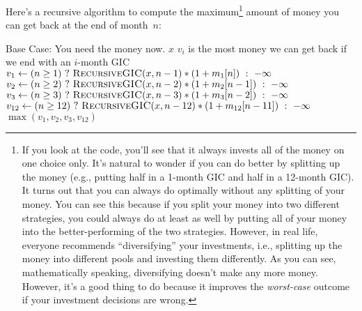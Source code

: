\documentclass[11pt]{article}
\begin{document}
Here's a recursive algorithm to compute the maximum\footnote{
If you look at the code, you'll see that it always invests all of the
money on one choice only.  It's natural to wonder if you can do better
by splitting up the money (e.g., putting half in a 1-month GIC and half
in a 12-month GIC).  It turns out that you can always do optimally
without any splitting of your money.  You can see this because if you
split your money into two different strategies, you could always do at least
as well by putting all of your money into the better-performing of the
two strategies.  However, in real life, everyone recommends ``diversifying''
your investments, i.e., splitting up the money into different pools and
investing them differently.  As you can see, mathematically speaking,
diversifying doesn't make any more money.  However, it's a good thing
to do because it improves the \textit{worst-case}
outcome if your investment decisions are wrong.}
amount of money
you can get back at the end of month~$n$:
\begin{algorithmic}[1]
 \Comment Base Case:  You need the money now.
	\State \Return $x$
\Else
        \Comment $v_i$ is the most money we can get back if we end with an $i$-month GIC
        \State $v_1 \gets (n\ge 1) \ ?\  \textsc{RecursiveGIC}(x,n-1)*(1+m_1[n])\  :\  -\infty$
        \State $v_2 \gets (n\ge 2) \ ?\  \textsc{RecursiveGIC}(x,n-2)*(1+m_2[n-1])\  :\  -\infty$
        \State $v_3 \gets (n\ge 3) \ ?\  \textsc{RecursiveGIC}(x,n-3)*(1+m_3[n-2])\  :\  -\infty$
        \State $v_{12} \gets (n\ge 12) \ ?\  \textsc{RecursiveGIC}(x,n-12)*(1+m_{12}[n-11])\  :\  -\infty$
        \State \Return $\max(v_1,v_2,v_3,v_{12})$
\EndIf
\EndFunction
\end{algorithmic}
\end{document}

